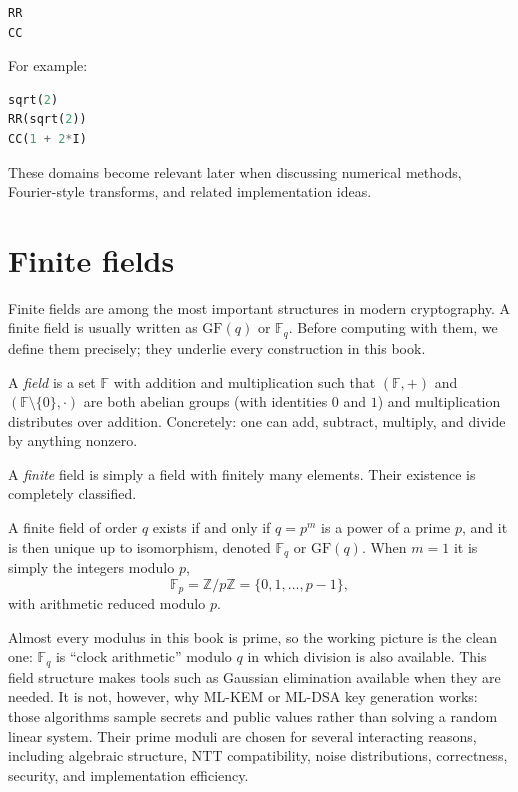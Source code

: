 \begin{lstlisting}[language=Python]
RR
CC
\end{lstlisting}

For example:

\begin{lstlisting}[language=Python]
sqrt(2)
RR(sqrt(2))
CC(1 + 2*I)
\end{lstlisting}

These domains become relevant later when discussing numerical methods, Fourier-style transforms, and related implementation ideas.

\section{Finite fields}
Finite fields are among the most important structures in modern cryptography. A finite field is usually written as $\mathrm{GF}(q)$ or $\mathbb{F}_q$. Before computing with them, we define them precisely; they underlie every construction in this book.

\begin{definition}[Field]
A \emph{field} is a set $\mathbb{F}$ with addition and multiplication such that $(\mathbb{F},+)$ and $(\mathbb{F}\setminus\{0\},\cdot)$ are both abelian groups (with identities $0$ and $1$) and multiplication distributes over addition. Concretely: one can add, subtract, multiply, and divide by anything nonzero.
\end{definition}

A \emph{finite} field is simply a field with finitely many elements. Their existence is completely classified.

\begin{theorem}
A finite field of order $q$ exists if and only if $q=p^m$ is a power of a prime $p$, and it is then unique up to isomorphism, denoted $\mathbb{F}_q$ or $\mathrm{GF}(q)$. When $m=1$ it is simply the integers modulo $p$,
\[
\mathbb{F}_p = \mathbb{Z}/p\mathbb{Z} = \{0,1,\dots,p-1\},
\]
with arithmetic reduced modulo $p$.
\end{theorem}

Almost every modulus in this book is prime, so the working picture is the clean one: $\mathbb{F}_q$ is ``clock arithmetic'' modulo $q$ in which division is also available. This field structure makes tools such as Gaussian elimination available when they are needed. It is not, however, why ML-KEM or ML-DSA key generation works: those algorithms sample secrets and public values rather than solving a random linear system. Their prime moduli are chosen for several interacting reasons, including algebraic structure, NTT compatibility, noise distributions, correctness, security, and implementation efficiency.

